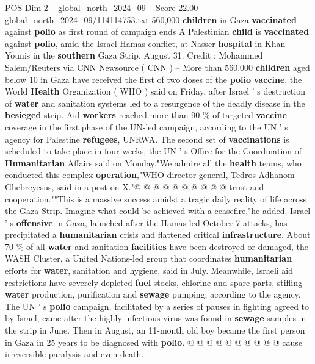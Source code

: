 \begin{textsample}{POS Dim 2 – global\_north\_2024\_09 – Score 22.00 – global\_north\_2024\_09/114114753.txt}  \label{ex:f2_pos_416}
560,000 \textbf{children} in Gaza \textbf{vaccinated} against \textbf{polio} as first round of campaign ends A Palestinian \textbf{child} is \textbf{vaccinated} against \textbf{polio}, amid the Israel-Hamas conflict, at Nasser \textbf{hospital} in Khan Younis in the \textbf{southern} Gaza Strip, August 31.
Credit : Mohammed Salem/Reuters via CNN Newsource ( CNN ) -- More than 560,000 \textbf{children} aged below 10 in Gaza have received the first of two doses of the \textbf{polio} \textbf{vaccine}, the World \textbf{Health} Organization ( WHO ) said on Friday, after Israel ' s destruction of \textbf{water} and sanitation systems led to a resurgence of the deadly disease in the \textbf{besieged} strip.
Aid \textbf{workers} reached more than 90 \% of targeted \textbf{vaccine} coverage in the first phase of the UN-led campaign, according to the UN ' s agency for Palestine \textbf{refugees}, UNRWA.
The second set of \textbf{vaccinations} is scheduled to take place in four weeks, the UN ' s Office for the Coordination of \textbf{Humanitarian} Affairs said on Monday."We admire all the \textbf{health} teams, who conducted this complex \textbf{operation},"WHO director-general, Tedros Adhanom Ghebreyesus, said in a post on X."@ @ @ @ @ @ @ @ @ @ trust and cooperation.""This is a massive success amidst a tragic daily reality of life across the Gaza Strip.
Imagine what could be achieved with a ceasefire,"he added.
Israel ' s \textbf{offensive} in Gaza, launched after the Hamas-led October 7 attacks, has precipitated a \textbf{humanitarian} crisis and flattened critical \textbf{infrastructure}.
About 70 \% of all \textbf{water} and sanitation \textbf{facilities} have been destroyed or damaged, the WASH Cluster, a United Nations-led group that coordinates \textbf{humanitarian} efforts for \textbf{water}, sanitation and hygiene, said in July.
Meanwhile, Israeli aid restrictions have severely depleted \textbf{fuel} stocks, chlorine and spare parts, stifling \textbf{water} production, purification and \textbf{sewage} pumping, according to the agency.
The UN ' s \textbf{polio} campaign, facilitated by a series of pauses in fighting agreed to by Israel, came after the highly infectious virus was found in \textbf{sewage} samples in the strip in June.
Then in August, an 11-month old boy became the first person in Gaza in 25 years to be diagnosed with \textbf{polio}. @ @ @ @ @ @ @ @ @ @ cause irreversible paralysis and even death.

\end{textsample}
